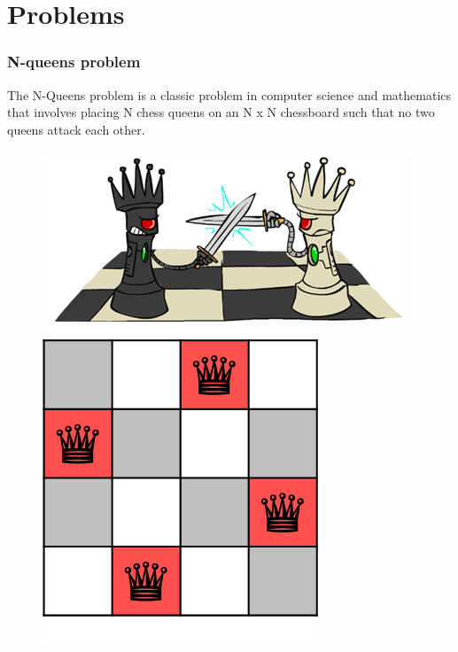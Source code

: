 \documentclass[
	11pt,
]{beamer}
\begin{document}
\section{Problems}
\begin{frame}
	\frametitle{N-queens problem}
	The N-Queens problem is a classic problem in computer science and mathematics that involves placing N chess queens on an N x N chessboard such that no two queens attack each other.
    \bigskip 
    \begin{figure}
        \centering
        \begin{minipage}{.5\textwidth}
          \centering
          \includegraphics[scale=0.4]{Figs/n_queens_1.png}
        \end{minipage}%
        \begin{minipage}{.5\textwidth}
          \centering
          \includegraphics[scale=0.4]{Figs/n_queens_2.png}
        \end{minipage}
        \end{figure}
\end{frame}
\end{document}
